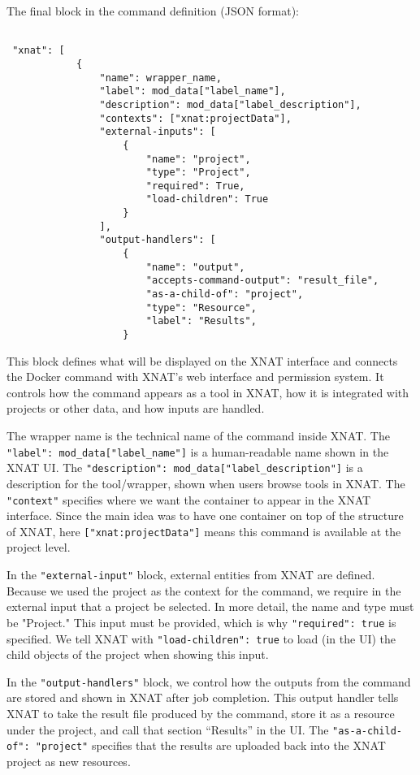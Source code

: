 The final block in the command definition (JSON format):

\begin{lstlisting}

 "xnat": [
            {
                "name": wrapper_name,
                "label": mod_data["label_name"],
                "description": mod_data["label_description"],
                "contexts": ["xnat:projectData"],  
                "external-inputs": [
                    { 
                        "name": "project",
                        "type": "Project",
                        "required": True,
                        "load-children": True
                    }
                ],
                "output-handlers": [
                    {
                        "name": "output",
                        "accepts-command-output": "result_file",
                        "as-a-child-of": "project",
                        "type": "Resource",
                        "label": "Results",
                    }
\end{lstlisting}

This block defines what will be displayed on the XNAT interface and connects the Docker command with XNAT's web interface and permission system. It controls how the command appears as a tool in XNAT, how it is integrated with projects or other data, and how inputs are handled.

The wrapper name is the technical name of the command inside XNAT. The \texttt{"label": mod\_data["label\_name"]} is a human-readable name shown in the XNAT \ac{UI}. The \texttt{"description": mod\_data["label\_description"]} is a description for the tool/wrapper, shown when users browse tools in XNAT. The \texttt{"context"} specifies where we want the container to appear in the XNAT interface. Since the main idea was to have one container on top of the structure of XNAT, here \texttt{["xnat:projectData"]} means this command is available at the project level.


In the \texttt{"external-input"} block, external entities from XNAT are defined. Because we used the project as the context for the command, we require in the external input that a project be selected. In more detail, the name and type must be "Project." This input must be provided, which is why \texttt{"required": true} is specified. We tell XNAT with \texttt{"load-children": true} to load (in the UI) the child objects of the project when showing this input.

In the \texttt{"output-handlers"} block, we control how the outputs from the command are stored and shown in XNAT after job completion. This output handler tells XNAT to take the result file produced by the command, store it as a resource under the project, and call that section ``Results'' in the UI. The \texttt{"as-a-child-of": "project"} specifies that the results are uploaded back into the XNAT project as new resources.

